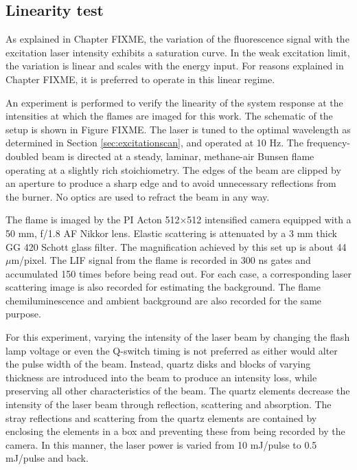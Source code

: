 \subsection{Linearity test}



As explained in Chapter FIXME, the variation of the fluorescence signal with the excitation laser intensity exhibits a saturation curve.
In the weak excitation limit, the variation is linear and scales with the energy input.
For reasons explained in Chapter FIXME, it is preferred to operate in this linear regime.

An experiment is performed to verify the linearity of the system response at the intensities at which the flames are imaged for this work.
The schematic of the setup is shown in Figure FIXME.
The laser is tuned to the optimal wavelength as determined in Section \ref{sec:excitationscan}, and operated at 10 Hz.
The frequency-doubled beam is directed at a steady, laminar, methane-air Bunsen flame operating at a slightly rich stoichiometry.
The edges of the beam are clipped by an aperture to produce a sharp edge and to avoid unnecessary reflections from the burner.
No optics are used to refract the beam in any way.

The flame is imaged by the PI Acton 512\(\times\)512 intensified camera equipped with a 50 mm, f/1.8 AF Nikkor lens.
Elastic scattering is attenuated by a 3 mm thick GG 420 Schott glass filter.
The magnification achieved by this set up is about 44 \(\mu\)m/pixel.
The LIF signal from the flame is recorded in 300 ns gates and accumulated 150 times before being read out.
For each case, a corresponding laser scattering image is also recorded for estimating the background.
The flame chemiluminescence and ambient background are also recorded for the same purpose.

For this experiment, varying the intensity of the laser beam by changing the flash lamp voltage or even the Q-switch timing is not preferred as either would alter the pulse width of the beam.
Instead, quartz disks and blocks of varying thickness are introduced into the beam to produce an intensity loss, while preserving all other characteristics of the beam.
The quartz elements decrease the intensity of the laser beam through reflection, scattering and absorption.
The stray reflections and scattering from the quartz elements are contained by enclosing the elements in a box and preventing these from being recorded by the camera.
In this manner, the laser power is varied from 10 mJ/pulse to 0.5 mJ/pulse and back.

